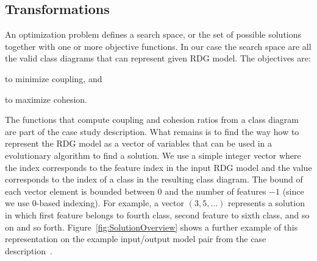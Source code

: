 \subsection{Transformations}

An optimization problem defines a search space, or the set of possible solutions together with one or more objective functions.
In our case the search space are all the valid class diagrams that can represent given RDG model.
The objectives are:
%
\begin{inparaenum}[(1)]
\item to minimize coupling, and
\item to maximize cohesion.     
\end{inparaenum}

The functions that compute coupling and cohesion ratios from a class diagram are part of the case study description.
What remains is to find the way how to represent the RDG model as a vector of variables that can be used in a evolutionary algorithm to find a solution.
We use a simple integer vector where the index corresponds to the feature index in the input RDG model and the value corresponds to the index of a class in the resulting class diagram.
The bound of each vector element is bounded between 0 and the number of features $- 1$ (since we use 0-based indexing).
For example, a vector $\left( 3, 5, \dots \right)$ represents a solution in which first feature belongs to fourth class, second feature to sixth class, and so on and so forth.
Figure~\ref{fig:SolutionOverview} shows a further example of this representation on the example input/output model pair from the case description~\cite{Fleck2016}.

